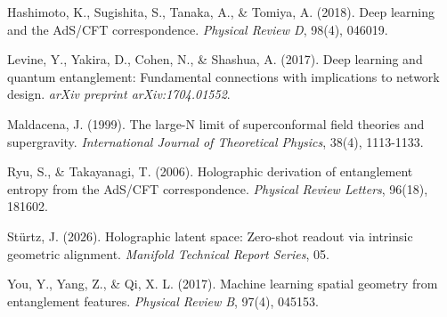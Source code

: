 \documentclass[12pt,a4paper]{article}
\begin{document}
\begin{enumerate}[leftmargin=1.5cm, label={[\arabic*]}]
\item Hashimoto, K., Sugishita, S., Tanaka, A., \& Tomiya, A. (2018). Deep learning and the AdS/CFT correspondence. \textit{Physical Review D}, 98(4), 046019.

\item Levine, Y., Yakira, D., Cohen, N., \& Shashua, A. (2017). Deep learning and quantum entanglement: Fundamental connections with implications to network design. \textit{arXiv preprint arXiv:1704.01552}.

\item Maldacena, J. (1999). The large-N limit of superconformal field theories and supergravity. \textit{International Journal of Theoretical Physics}, 38(4), 1113-1133.

\item Ryu, S., \& Takayanagi, T. (2006). Holographic derivation of entanglement entropy from the AdS/CFT correspondence. \textit{Physical Review Letters}, 96(18), 181602.

\item Stürtz, J. (2026). Holographic latent space: Zero-shot readout via intrinsic geometric alignment. \textit{Manifold Technical Report Series}, 05.

\item You, Y., Yang, Z., \& Qi, X. L. (2017). Machine learning spatial geometry from entanglement features. \textit{Physical Review B}, 97(4), 045153.
\end{enumerate}
\end{document}
